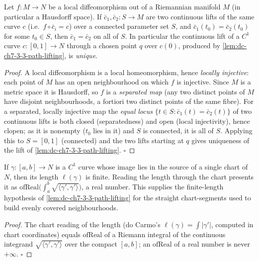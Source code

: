 \begin{lemma}
  \label{lem:dc-ch7-3-3-lift-unique}
  \leanok
  Let $f:M\to N$ be a local diffeomorphism out of a Riemannian manifold $M$ (in
  particular a Hausdorff space). If $\bar c_1,\bar c_2:S\to M$ are two continuous
  lifts of the same curve $c$ (i.e.\ $f\circ\bar c_i=c$) over a connected parameter
  set $S$, and $\bar c_1(t_0)=\bar c_2(t_0)$ for some $t_0\in S$, then
  $\bar c_1=\bar c_2$ on all of $S$. In particular the continuous lift of a $C^1$
  curve $c:[0,1]\to N$ through a chosen point $q$ over $c(0)$, produced by
  \cref{lem:dc-ch7-3-3-path-lifting}, is \emph{unique}.
\end{lemma}
\begin{proof}
  \leanok
  A local diffeomorphism is a local homeomorphism, hence \emph{locally injective}:
  each point of $M$ has an open neighbourhood on which $f$ is injective. Since $M$
  is a metric space it is Hausdorff, so $f$ is a \emph{separated map} (any two
  distinct points of $M$ have disjoint neighbourhoods, a fortiori two distinct
  points of the same fibre). For a separated, locally injective map the
  \emph{equal locus} $\{t\in S:\bar c_1(t)=\bar c_2(t)\}$ of two continuous lifts is
  both closed (separatedness) and open (local injectivity), hence clopen; as it is
  nonempty ($t_0$ lies in it) and $S$ is connected, it is all of $S$. Applying this
  to $S=[0,1]$ (connected) and the two lifts starting at $q$ gives uniqueness of the
  lift of \cref{lem:dc-ch7-3-3-path-lifting}. $\square$
\end{proof}

\begin{lemma}
  \label{lem:dc-ch7-3-3-chart-length-finite}
  \leanok
  If $\gamma:[a,b]\to N$ is a $C^1$ curve whose image lies in the source of a single
  chart of $N$, then its length $\ell(\gamma)$ is finite. Reading the length through
  the chart presents it as $\mathrm{ofReal}\big(\int_a^b\sqrt{\langle\gamma',\gamma'\rangle}\big)$,
  a real number. This supplies the finite-length hypothesis of
  \cref{lem:dc-ch7-3-3-path-lifting} for the straight chart-segments used to build
  evenly covered neighbourhoods.
\end{lemma}
\begin{proof}
  \leanok
  The chart reading of the length (do Carmo's $\ell(\gamma)=\int|\gamma'|$, computed
  in chart coordinates) equals $\mathrm{ofReal}$ of a Riemann integral of the
  continuous integrand $\sqrt{\langle\gamma',\gamma'\rangle}$ over the compact
  $[a,b]$; an $\mathrm{ofReal}$ of a real number is never $+\infty$. $\square$
\end{proof}

